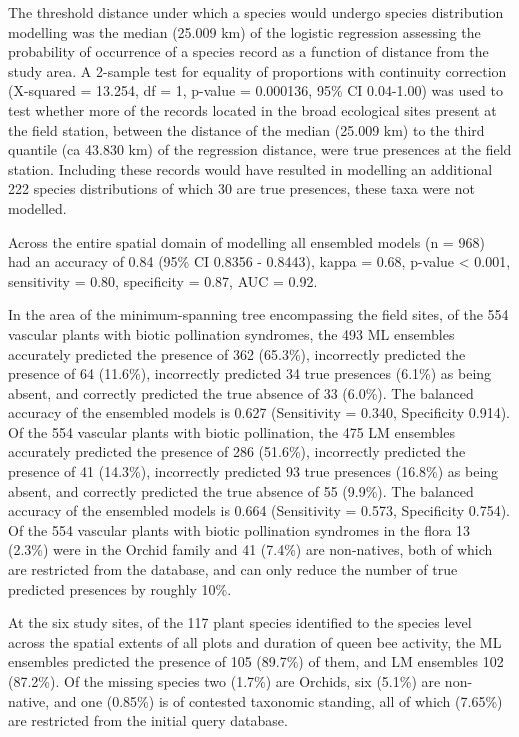 \documentclass[
]{article}
\begin{document}
The threshold distance under which a species would undergo species
distribution modelling was the median (25.009 km) of the logistic
regression assessing the probability of occurrence of a species record
as a function of distance from the study area. A 2-sample test for
equality of proportions with continuity correction (X-squared = 13.254,
df = 1, p-value = 0.000136, 95\% CI 0.04-1.00) was used to test whether
more of the records located in the broad ecological sites present at the
field station, between the distance of the median (25.009 km) to the
third quantile (ca 43.830 km) of the regression distance, were true
presences at the field station. Including these records would have
resulted in modelling an additional 222 species distributions of which
30 are true presences, these taxa were not modelled.

Across the entire spatial domain of modelling all ensembled models (n =
968) had an accuracy of 0.84 (95\% CI 0.8356 - 0.8443), kappa = 0.68,
p-value \textless{} 0.001, sensitivity = 0.80, specificity = 0.87, AUC =
0.92.

In the area of the minimum-spanning tree encompassing the field sites,
of the 554 vascular plants with biotic pollination syndromes, the 493 ML
ensembles accurately predicted the presence of 362 (65.3\%), incorrectly
predicted the presence of 64 (11.6\%), incorrectly predicted 34 true
presences (6.1\%) as being absent, and correctly predicted the true
absence of 33 (6.0\%). The balanced accuracy of the ensembled models is
0.627 (Sensitivity = 0.340, Specificity 0.914). Of the 554 vascular
plants with biotic pollination, the 475 LM ensembles accurately
predicted the presence of 286 (51.6\%), incorrectly predicted the
presence of 41 (14.3\%), incorrectly predicted 93 true presences
(16.8\%) as being absent, and correctly predicted the true absence of 55
(9.9\%). The balanced accuracy of the ensembled models is 0.664
(Sensitivity = 0.573, Specificity 0.754). Of the 554 vascular plants
with biotic pollination syndromes in the flora 13 (2.3\%) were in the
Orchid family and 41 (7.4\%) are non-natives, both of which are
restricted from the database, and can only reduce the number of true
predicted presences by roughly 10\%.

At the six study sites, of the 117 plant species identified to the
species level across the spatial extents of all plots and duration of
queen bee activity, the ML ensembles predicted the presence of 105
(89.7\%) of them, and LM ensembles 102 (87.2\%). Of the missing species
two (1.7\%) are Orchids, six (5.1\%) are non-native, and one (0.85\%) is
of contested taxonomic standing, all of which (7.65\%) are restricted
from the initial query database.
\end{document}
